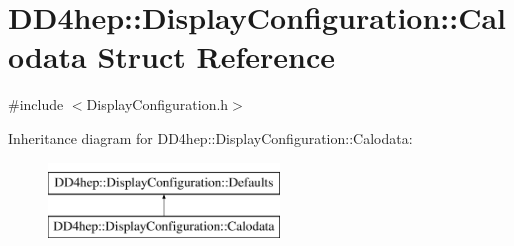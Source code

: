 \hypertarget{struct_d_d4hep_1_1_display_configuration_1_1_calodata}{}\section{D\+D4hep\+:\+:Display\+Configuration\+:\+:Calodata Struct Reference}
\label{struct_d_d4hep_1_1_display_configuration_1_1_calodata}


{\ttfamily \#include $<$Display\+Configuration.\+h$>$}

Inheritance diagram for D\+D4hep\+:\+:Display\+Configuration\+:\+:Calodata\+:\begin{figure}[H]
\begin{center}
\leavevmode
\includegraphics[height=2.000000cm]{struct_d_d4hep_1_1_display_configuration_1_1_calodata}
\end{center}
\end{figure}
